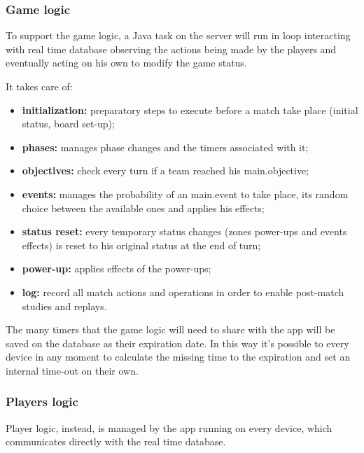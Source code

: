 			\subsubsection{Game logic}
			
				To support the game logic, a Java task on the server will run in loop interacting with real time database observing the actions being made by the players and eventually acting on his own to modify the game status.
				
				It takes care of:
				\begin{itemize}
					\item \textbf{initialization:} preparatory steps to execute before a match take place (initial status, board set-up);
					\item \textbf{phases:} manages phase changes and the timers associated with it;
					\item \textbf{objectives:} check every turn if a team reached his main.objective;
					\item \textbf{events:} manages the probability of an main.event to take place, its random choice between the available ones and applies his effects;
					\item \textbf{status reset:} every temporary status changes (zones power-ups and events effects) is reset to his original status at the end of turn;
					\item \textbf{power-up:} applies effects of the power-ups;
					\item \textbf{log:} record all match actions and operations in order to enable post-match studies and replays.  
				\end{itemize}
				
				The many timers that the game logic will need to share with the app will be saved on the database as their expiration date. In this way it's possible to every device in any moment to calculate the missing time to the expiration and set an internal time-out on their own.
			
			\subsubsection{Players logic}
			
				Player logic, instead, is managed by the app running on every device, which communicates directly with the real time database.
				
